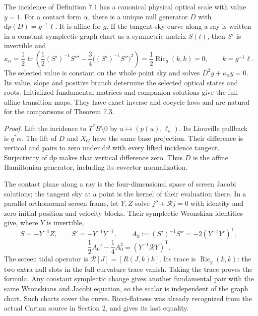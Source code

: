 \documentclass[
  english,
  11pt,
  reqno]{amsart}
\begin{document}
The incidence of Definition 7.1 has a canonical physical optical scale
with value \(y=1\). For a contact form \(\alpha\), there is a unique
null generator \(D\) with \(\mathrm dp(D)=g^{-1}\ell\). It is affine for
\(g\). If the tangent-sky curve along a ray is written in a constant
symplectic graph chart as a symmetric matrix \(S(t)\), then \(S'\) is
invertible and%
 \[
\kappa_\alpha
=\frac12\operatorname{tr}\left(
\frac12(S')^{-1}S'''-
\frac34\bigl((S')^{-1}S''\bigr)^2\right)
=\frac12\operatorname{Ric}_g(k,k)=0,
\qquad k=g^{-1}\ell.
\] The selected value is constant on the whole point sky and solves
\(D^2y+\kappa_\alpha y=0\). Its value, slope and positive branch
determine the selected optical states and roots. Initialized fundamental
matrices and companion solutions give the full affine transition maps.
They have exact inverse and cocycle laws and are natural for the
comparisons of Theorem 7.3.

\emph{Proof.} Lift the incidence to \(T^*B\setminus0\) by
\(u\mapsto(p(u),\ell_u)\). Its Liouville pullback is \(q^*\alpha\). The
lift of \(D\) and \(X_G\) have the same base projection. Their
difference is vertical and pairs to zero under \(\mathrm d\vartheta\)
with every lifted incidence tangent. Surjectivity of \(\mathrm dp\)
makes that vertical difference zero. Thus \(D\) is the affine
Hamiltonian generator, including its covector normalization.

The contact plane along a ray is the four-dimensional space of screen
Jacobi solutions; the tangent sky at a point is the kernel of their
evaluation there. In a parallel orthonormal screen frame, let \(Y,Z\)
solve \(j''+\mathcal Rj=0\) with identity and zero initial position and
velocity blocks. Their symplectic Wronskian identities give, where \(Y\)
is invertible, \[
S=-Y^{-1}Z,\qquad
S'=-Y^{-1}Y^{-\mathsf T},\qquad
A_0:=(S')^{-1}S''=-2(Y^{-1}Y')^{\mathsf T},
\] \label{eq:online-optical-jacobi-calculation} \[
\frac12A_0'-\frac14A_0^2
=(Y^{-1}\mathcal RY)^{\mathsf T}.
\] The screen tidal operator is \(\mathcal R[J]=[R(J,k)k]\). Its trace
is \(\operatorname{Ric}_g(k,k)\): the two extra null slots in the full
curvature trace vanish. Taking the trace proves the formula. Any
constant symplectic change gives another fundamental pair with the same
Wronskians and Jacobi equation, so the scalar is independent of the
graph chart. Such charts cover the curve. Ricci-flatness was already
recognized from the actual Cartan source in Section 2, and gives its
last equality.
\end{document}
